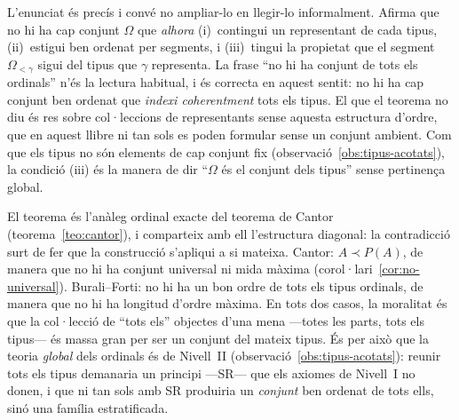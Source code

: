 \begin{observacio}\label{obs:burali-hipotesi}
L'enunciat és precís i convé no ampliar-lo en llegir-lo informalment. Afirma
que no hi ha cap conjunt \(\Omega\) que \emph{alhora} (i)~contingui un
representant de cada tipus, (ii)~estigui ben ordenat per segments, i
(iii)~tingui la propietat que el segment \(\Omega_{<\gamma}\) sigui del tipus
que \(\gamma\) representa. La frase \enquote{no hi ha conjunt de tots els
ordinals} n'és la lectura habitual, i és correcta en aquest sentit: no hi ha
cap conjunt ben ordenat que \emph{indexi coherentment} tots els tipus. El que
el teorema no diu és res sobre col·leccions de representants sense aquesta
estructura d'ordre, que en aquest llibre ni tan sols es poden formular sense
un conjunt ambient. Com que els tipus no són elements de cap conjunt fix
(observació~\ref{obs:tipus-acotats}), la condició (iii) és la manera de dir
\enquote{\(\Omega\) és el conjunt dels tipus} sense pertinença global.
\end{observacio}

\begin{observacio}\label{obs:burali-cantor}
El teorema és l'anàleg ordinal exacte del teorema de Cantor
(teorema~\ref{teo:cantor}), i comparteix amb ell l'estructura diagonal: la
contradicció surt de fer que la construcció s'apliqui a si mateixa. Cantor:
\(A\prec P(A)\), de manera que no hi ha conjunt universal ni mida màxima
(corol·lari~\ref{cor:no-universal}). Burali--Forti: no hi ha un bon ordre de
tots els tipus ordinals, de manera que no hi ha longitud d'ordre màxima. En
tots dos casos, la moralitat és que la col·lecció de \enquote{tots els}
objectes d'una mena ---totes les parts, tots els tipus--- és massa gran per
ser un conjunt del mateix tipus. És per això que la teoria \emph{global} dels
ordinals és de Nivell~II (observació~\ref{obs:tipus-acotats}): reunir tots els
tipus demanaria un principi ---SR--- que els axiomes de Nivell~I no donen, i
que ni tan sols amb SR produiria un \emph{conjunt} ben ordenat de tots ells,
sinó una família estratificada.
\end{observacio}

